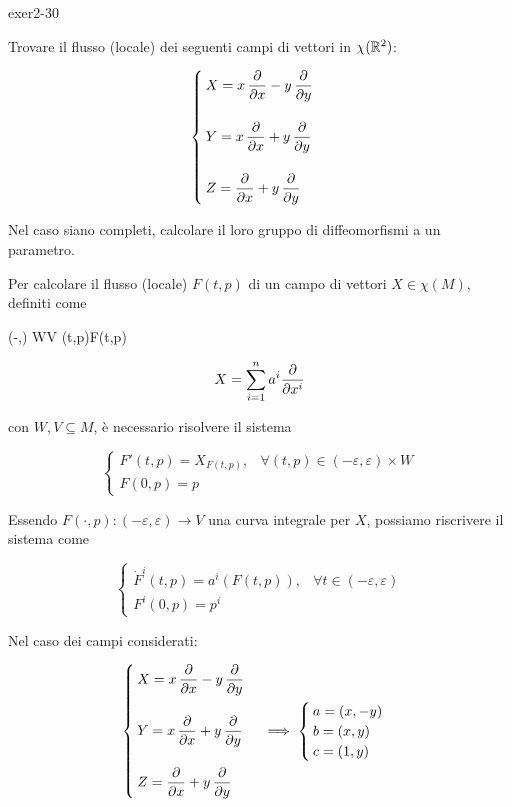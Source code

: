 {exer2-30}
{
Trovare il flusso (locale) dei seguenti campi di vettori in $ \chi(\mathbb{R}^{2}) $:

\begin{equation}
	\begin{cases}
		X = x \, \dpdv{x} - y \, \dpdv{y} \\ \\
		Y = x \, \dpdv{x} + y \, \dpdv{y} \\ \\
		Z = \dpdv{x} + y \, \dpdv{y}
	\end{cases}
\end{equation}

Nel caso siano completi, calcolare il loro gruppo di diffeomorfismi a un parametro.
}
{
Per calcolare il flusso (locale) $ F(t,p) $ di un campo di vettori $ X \in \chi(M) $, definiti come

	{(-\varepsilon,\varepsilon) \times W}{V}
	{(t,p)}{F(t,p)}

\begin{equation}
	X = \sum_{i=1}^{n} a^{i} \pdv{x^{i}}
\end{equation}

con $ W,V \subseteq M $, è necessario risolvere il sistema

\begin{equation}
	\begin{cases}
		F'(t,p) = X_{F(t,p)}, & \forall (t,p) \in (-\varepsilon,\varepsilon) \times W \\
		F(0,p) = p
	\end{cases}
\end{equation}

Essendo $ F(\cdot,p) : (-\varepsilon,\varepsilon) \to V $ una curva integrale per $ X $, possiamo riscrivere il sistema come

\begin{equation}
	\begin{cases}
		\dot{F}^{i}(t,p) = a^{i}(F(t,p)), & \forall t \in (-\varepsilon,\varepsilon) \\
		F^{i}(0,p) = p^{i}
	\end{cases}
\end{equation}

Nel caso dei campi considerati:

\begin{equation}
	\begin{cases}
		X = x \, \dpdv{x} - y \, \dpdv{y} \\ \\
		Y = x \, \dpdv{x} + y \, \dpdv{y} \\ \\
		Z = \dpdv{x} + y \, \dpdv{y}
	\end{cases} %
	\implies %
	\begin{cases}
		a = (x,-y) \\
		b = (x,y) \\
		c = (1,y)
	\end{cases}
\end{equation}

}
